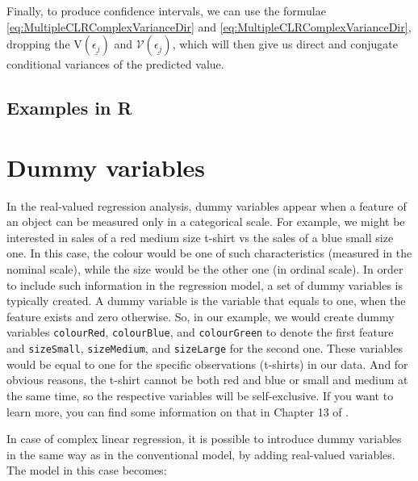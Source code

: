 \documentclass[
]{book}
\begin{document}
Finally, to produce confidence intervals, we can use the formulae \eqref{eq:MultipleCLRComplexVarianceDir} and \eqref{eq:MultipleCLRComplexVarianceDir}, dropping the \(\mathrm{V}\left(\underline{\epsilon_j}\right)\) and \(\mathcal{V}\left(\underline{\epsilon_j}\right)\), which will then give us direct and conjugate conditional variances of the predicted value.

\hypertarget{examples-in-r-2}{%
\subsection{Examples in R}\label{examples-in-r-2}}

\hypertarget{dummy-variables}{%
\section{Dummy variables}\label{dummy-variables}}

In the real-valued regression analysis, dummy variables appear when a feature of an object can be measured only in a categorical scale. For example, we might be interested in sales of a red medium size t-shirt vs the sales of a blue small size one. In this case, the colour would be one of such characteristics (measured in the nominal scale), while the size would be the other one (in ordinal scale). In order to include such information in the regression model, a set of dummy variables is typically created. A dummy variable is the variable that equals to one, when the feature exists and zero otherwise. So, in our example, we would create dummy variables \texttt{colourRed}, \texttt{colourBlue}, and \texttt{colourGreen} to denote the first feature and \texttt{sizeSmall}, \texttt{sizeMedium}, and \texttt{sizeLarge} for the second one. These variables would be equal to one for the specific observations (t-shirts) in our data. And for obvious reasons, the t-shirt cannot be both red and blue or small and medium at the same time, so the respective variables will be self-exclusive. If you want to learn more, you can find some information on that in Chapter 13 of \citet{SvetunkovSBA}.

In case of complex linear regression, it is possible to introduce dummy variables in the same way as in the conventional model, by adding real-valued variables. The model in this case becomes:
\end{document}
